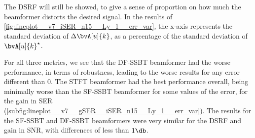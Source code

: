 The DSRF will still be showed, to give a sense of proportion on how much the beamformer distorts the desired signal. In the results of \cref{fig:lineplot__v7_iSER_n15__Ly_1__err_var}, the x-axis represents the standard deviation of $\Delta\bvA[u]{k}$, as a percentage of the standard deviation of $\bvA[u]{k}^\star$.

For all three metrics, we see that the DF-SSBT beamformer had the worse performance, in terms of robustness, leading to the worse results for any error different than $0$. The STFT beamformer had the best performance overall, being minimally worse than the SF-SSBT beamformer for some values of the error, for the gain in SER (\cref{subfig:lineplot__v7__gSER__iSER_n15__Ly_1__err_var}). The results for the SF-SSBT and DF-SSBT beamformers were very similar for the DSRF and gain in SNR, with differences of less than $1\dB$.